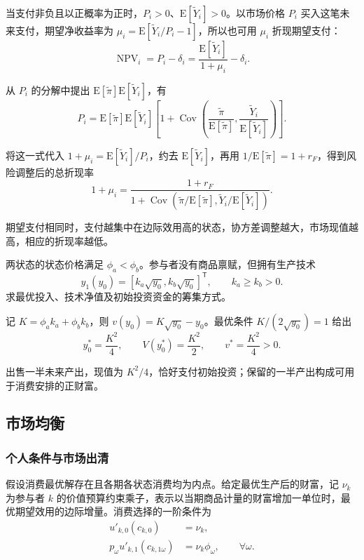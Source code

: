 当支付非负且以正概率为正时，$P_i>0$、$\mathrm E[\widetilde Y_i]>0$。以市场价格 $P_i$ 买入这笔未来支付，期望净收益率为 $\mu_i=\mathrm E[\widetilde Y_i/P_i-1]$，所以也可用 $\mu_i$ 折现期望支付：
\[
 \operatorname{NPV}_i=P_i-\delta_i
 =\frac{\mathrm E[\widetilde Y_i]}{1+\mu_i}-\delta_i.
\]

从 $P_i$ 的分解中提出 $\mathrm E[\widetilde\pi]\mathrm E[\widetilde Y_i]$，有
\[
 P_i=\mathrm E[\widetilde\pi]\mathrm E[\widetilde Y_i]
 \left[1+\operatorname{Cov}\!\left(
 \frac{\widetilde\pi}{\mathrm E[\widetilde\pi]},
 \frac{\widetilde Y_i}{\mathrm E[\widetilde Y_i]}
 \right)\right].
\]

将这一式代入 $1+\mu_i=\mathrm E[\widetilde Y_i]/P_i$，约去 $\mathrm E[\widetilde Y_i]$，再用 $1/\mathrm E[\widetilde\pi]=1+r_F$，得到风险调整后的总折现率
\[
 1+\mu_i=\frac{1+r_F}
 {1+\operatorname{Cov}\!\left(\widetilde\pi/\mathrm E[\widetilde\pi],\widetilde Y_i/\mathrm E[\widetilde Y_i]\right)}.
\]

期望支付相同时，支付越集中在边际效用高的状态，协方差调整越大，市场现值越高，相应的折现率越低。

\begin{tcolorbox}[example]
\begin{question}
 两状态的状态价格满足 $\phi_a<\phi_b$。参与者没有商品禀赋，但拥有生产技术
\[
 y_1(y_0)=[k_a\sqrt{y_0},k_b\sqrt{y_0}]^{\mathsf T},\qquad k_a\ge k_b>0.
\]
求最优投入、技术净值及初始投资资金的筹集方式。

\end{question}
\begin{solution}
记 $K=\phi_ak_a+\phi_bk_b$，则 $v(y_0)=K\sqrt{y_0}-y_0$。最优条件 $K/(2\sqrt{y_0})=1$ 给出
\[
 y_0^*=\frac{K^2}{4},\qquad V(y_0^*)=\frac{K^2}{2},\qquad v^*=\frac{K^2}{4}>0.
\]

出售一半未来产出，现值为 $K^2/4$，恰好支付初始投资；保留的一半产出构成可用于消费安排的正财富。\end{solution}
\end{tcolorbox}

\subsection{市场均衡}
\subsubsection{个人条件与市场出清}
假设消费最优解存在且各期各状态消费均为内点。给定最优生产后的财富，记 $\nu_k$ 为参与者 $k$ 的价值预算约束乘子，表示以当期商品计量的财富增加一单位时，最优期望效用的边际增量。消费选择的一阶条件为
\begin{subequations}\label{eq:wj-15-6}
\begin{align}
 u'_{k,0}(c_{k,0})&=\nu_k,\label{eq:wj-15-6a}\\
 p_\omega u'_{k,1}(c_{k,1\omega})&=\nu_k\phi_\omega,\qquad\forall\omega.\label{eq:wj-15-6b}
\end{align}
\end{subequations}

